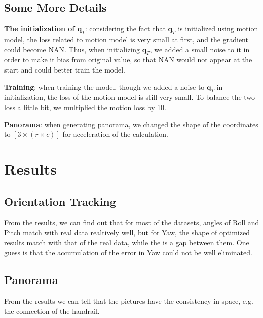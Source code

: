 \documentclass[conference]{IEEEtran}
\begin{document}
\subsection{Some More Details}
\textbf{The initialization of $\boldsymbol{q}_T$}: considering the fact that $\boldsymbol{q}_T$ is initialized using
motion model, the loss related to motion model is very small at first, and the gradient could become NAN. Thus, when
initializing $\boldsymbol{q}_T$, we added a small noise to it in order to make it bias from original value, so that
NAN would not appear at the start and could better train the model.

\textbf{Training}: when training the model, though we added a noise to $\boldsymbol{q}_T$ in initialization, the loss of
the motion model is still very small. To balance the two loss a little bit, we multiplied the motion loss by 10.

\textbf{Panorama}: when generating panorama, we changed the shape of the coordinates to $[3 \times (r \times c)]$ for
acceleration of the calculation.


\section{Results}
\subsection{Orientation Tracking}
From the results, we can find out that for most of the datasets, angles of Roll and Pitch match with real data realtively
well, but for Yaw, the shape of optimized results match with that of the real data, while the is a gap between them. One
guess is that the accumulation of the error in Yaw could not be well eliminated.

\subsection{Panorama}
From the results we can tell that the pictures have the consistency in space, e.g. the connection of the handrail.
\end{document}
